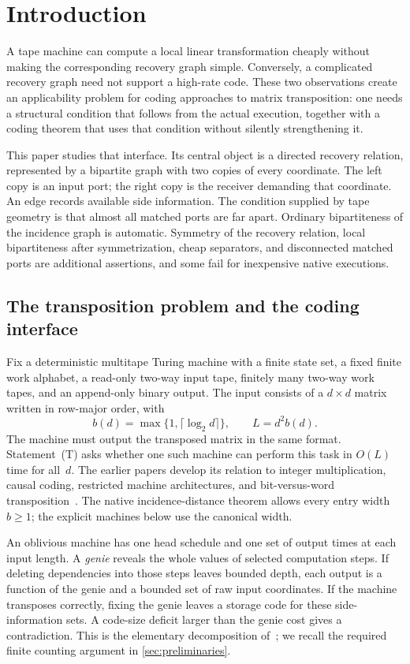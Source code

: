 \section{Introduction}\label{sec:introduction}

A tape machine can compute a local linear transformation cheaply without making the corresponding recovery graph simple. Conversely, a complicated recovery graph need not support a high-rate code. These two observations create an applicability problem for coding approaches to matrix transposition: one needs a structural condition that follows from the actual execution, together with a coding theorem that uses that condition without silently strengthening it.

This paper studies that interface. Its central object is a directed recovery relation, represented by a bipartite graph with two copies of every coordinate. The left copy is an input port; the right copy is the receiver demanding that coordinate. An edge records available side information. The condition supplied by tape geometry is that almost all matched ports are far apart. Ordinary bipartiteness of the incidence graph is automatic. Symmetry of the recovery relation, local bipartiteness after symmetrization, cheap separators, and disconnected matched ports are additional assertions, and some fail for inexpensive native executions.

\subsection{The transposition problem and the coding interface}
Fix a deterministic multitape Turing machine with a finite state set, a fixed finite work alphabet, a read-only two-way input tape, finitely many two-way work tapes, and an append-only binary output. The input consists of a $d\times d$ matrix written in row-major order, with
\[
 b(d)=\max\{1,\lceil\log_2 d\rceil\},\qquad L=d^2b(d).
\]
The machine must output the transposed matrix in the same format. Statement~(T) asks whether one such machine can perform this task in $O(L)$ time for all~$d$. The earlier papers develop its relation to integer multiplication, causal coding, restricted machine architectures, and bit-versus-word transposition~\cite{BrendeTapeCoding,BrendeLocalCoding,BrendeBitWord,BrendeCurved}. The native incidence-distance theorem allows every entry width $b\ge1$; the explicit machines below use the canonical width.

An oblivious machine has one head schedule and one set of output times at each input length. A \emph{genie} reveals the whole values of selected computation steps. If deleting dependencies into those steps leaves bounded depth, each output is a function of the genie and a bounded set of raw input coordinates. If the machine transposes correctly, fixing the genie leaves a storage code for these side-information sets. A code-size deficit larger than the genie cost gives a contradiction. This is the elementary decomposition of~\cite[Theorem~D]{BrendeCurved}; we recall the required finite counting argument in \cref{sec:preliminaries}.

